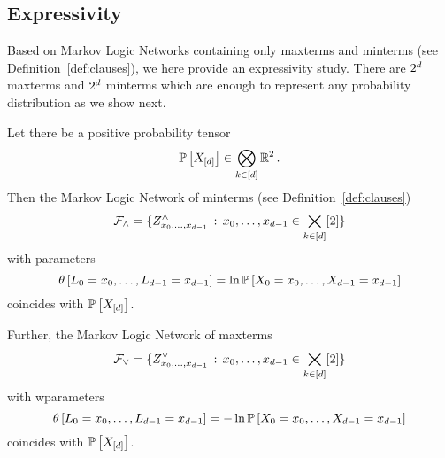 \subsection{Expressivity}\label{sec:MLNMaxMintermRep}

Based on Markov Logic Networks containing only maxterms and minterms (see Definition~\ref{def:clauses}), we here provide an expressivity study.
There are $2^{d}$ maxterms and $2^{d}$ minterms which are enough to represent any probability distribution as we show next.

\begin{theorem}\label{the:maximalClausesRepresentation}\label{the:mintermExpressivityMLN}
	Let there be a positive probability tensor %
		 \[ \mathbb{P}\left[X_{[d]}\right] \in \bigotimes_{k\in[d]}\mathbb{R}^2 \, . \] %
	Then the Markov Logic Network of minterms (see Definition~\ref{def:clauses})
		\[ \mathcal{F}_{\land} = \{Z^{\land}_{{x_{0},\ldots,x_{d-1}}} \, : \, {x_{0},\ldots,x_{d-1}}\in\bigtimes_{k\in[d]}[2] \}\]
	with parameters %
		\[ \canparamat{\selvariableof{0}=\catindexof{0},\ldots,\selvariableof{\atomorder-1}=\catindexof{\atomorder-1}}%
		= \ln \probof{\indexedcatvariables} \]
	coincides with $\mathbb{P}\left[X_{[d]}\right]$.

	Further, the Markov Logic Network of maxterms
		\[ \mathcal{F}_{\lor} = \{Z^{\lor}_{{x_{0},\ldots,x_{d-1}}} \, : \, {x_{0},\ldots,x_{d-1}}\in\bigtimes_{k\in[d]}[2] \}\]
	with wparameters
		\[ \canparamat{\selvariableof{0}=\catindexof{0},\ldots,\selvariableof{\atomorder-1}=\catindexof{\atomorder-1}} %
		= - \ln\probof{\indexedcatvariables} \]
	coincides with $\mathbb{P}\left[X_{[d]}\right]$.
\end{theorem}
